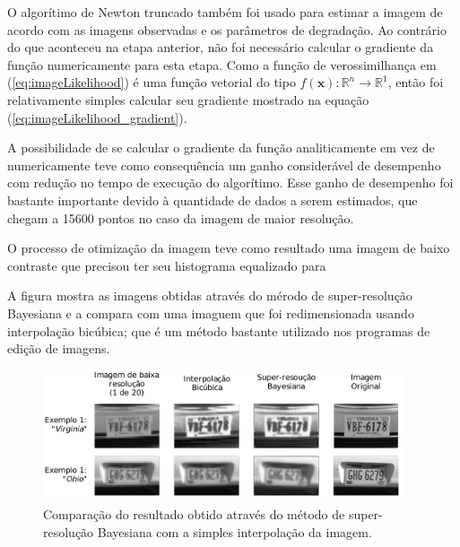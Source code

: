 O algorítimo de Newton truncado também foi usado para estimar a imagem de acordo com as imagens observadas e os parâmetros de degradação.
Ao contrário do que aconteceu na etapa anterior, não foi necessário calcular o gradiente da função numericamente para esta etapa.
Como a função de verossimilhança em (\ref{eq:imageLikelihood}) é uma função vetorial do tipo $ f(\mathbf{x}) : \mathbb{R}^n \to \mathbb{R}^1$, então foi relativamente simples calcular seu gradiente mostrado na equação (\ref{eq:imageLikelihood_gradient}).

A possibilidade de se calcular o gradiente da função analiticamente em vez de numericamente teve como consequência um ganho considerável de desempenho com redução no tempo de execução do algorítimo.
Esse ganho de desempenho foi bastante importante devido à quantidade de dados a serem estimados, que chegam a 15600 pontos no caso da imagem de maior resolução.


O processo de otimização da imagem teve como resultado uma imagem de baixo contraste que precisou ter seu histograma equalizado para 

A figura \label{fig:results_compare} mostra as imagens obtidas através do mérodo de super-resolução Bayesiana e a compara com uma imaguem que foi redimensionada usando interpolação bicúbica; que é um método bastante utilizado nos programas de edição de imagens.

\begin{figure}[H]
	\centering
	\caption{Comparação do resultado obtido através do método de super-resolução Bayesiana com a simples interpolação da imagem.}
	\label{fig:results_compare}
	\includegraphics[width = 0.95\textwidth]{./figures/results_figures/result_compare.pdf}
\end{figure}
